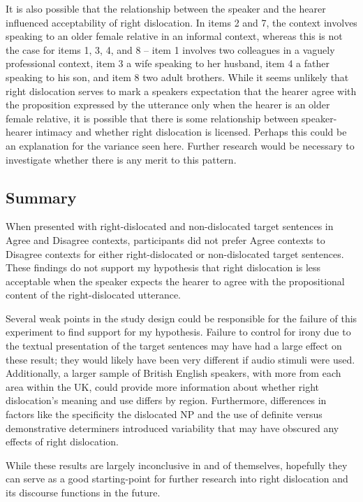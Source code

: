 \documentclass[titlepage,12pt]{article}
\begin{document}
It is also possible that the relationship between the speaker and the hearer influenced acceptability of right dislocation. In items 2 and 7, the context involves speaking to an older female relative in an informal context, whereas this is not the case for items 1, 3, 4, and 8 -- item 1 involves two colleagues in a vaguely professional context, item 3 a wife speaking to her husband, item 4 a father speaking to his son, and item 8 two adult brothers. While it seems unlikely that right dislocation serves to mark a speakers expectation that the hearer agree with the proposition expressed by the utterance only when the hearer is an older female relative, it is possible that there is some relationship between speaker-hearer intimacy and whether right dislocation is licensed. Perhaps this could be an explanation for the variance seen here. Further research would be necessary to investigate whether there is any merit to this pattern.

\subsection{Summary}

When presented with right-dislocated and non-dislocated target sentences in Agree and Disagree contexts, participants did not prefer Agree contexts to Disagree contexts for either right-dislocated or non-dislocated target sentences. These findings do not support my hypothesis that right dislocation is less acceptable when the speaker expects the hearer to agree with the propositional content of the right-dislocated utterance. 

Several  weak points in the study design could be responsible for the failure of this experiment to find support for my hypothesis. Failure to control for irony due to the textual presentation of the target sentences may have had a large effect on these result; they would likely have been very different if audio stimuli were used. Additionally, a larger sample of British English speakers, with more from each area within the UK, could provide more information about whether right dislocation's meaning and use differs by region. Furthermore, differences in factors like the specificity the dislocated NP and the use of definite versus demonstrative determiners introduced variability that may have obscured any effects of right dislocation.

While these results are largely inconclusive in and of themselves, hopefully they can serve as a good starting-point for further research into right dislocation and its discourse functions in the future.
\end{document}
